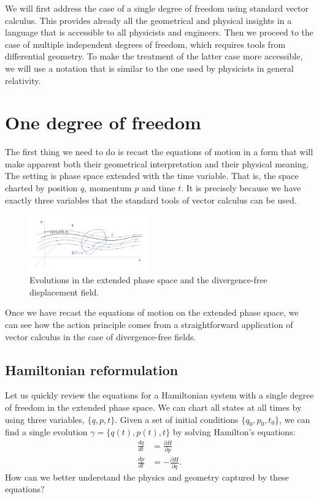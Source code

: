 \documentclass[10pt,twocolumn, nofootinbib]{revtex4-2}
\begin{document}
We will first address the case of a single degree of freedom using standard vector calculus. This provides already all the geometrical and physical insights in a language that is accessible to all physicists and engineers. Then we proceed to the case of multiple independent degrees of freedom, which requires tools from differential geometry. To make the treatment of the latter case more accessible, we will use a notation that is similar to the one used by physicists in general relativity.

\section{One degree of freedom}

The first thing we need to do is recast the equations of motion in a form that will make apparent both their geometrical interpretation and their physical meaning. The setting is phase space extended with the time variable. That is, the space charted by position $q$, momentum $p$ and time $t$. It is precisely because we have exactly three variables that the standard tools of vector calculus can be used.

\begin{figure}
	\includegraphics[width = 0.45\textwidth]{ExtendedPhaseSpace}
	\caption{\footnotesize{Evolutions in the extended phase space and the divergence-free displacement field.}}\label{extended_phase_space}
\end{figure}

Once we have recast the equations of motion on the extended phase space, we can see how the action principle comes from a straightforward application of vector calculus in the case of divergence-free fields.

\subsection{Hamiltonian reformulation}

Let us quickly review the equations for a Hamiltonian system with a single degree of freedom in the extended phase space. We can chart all states at all times by using three variables, $\{q,p,t\}$. Given a set of initial conditions $\{q_0,p_0,t_0\}$, we can find a single evolution $\gamma = \{q(t), p(t), t\}$ by solving Hamilton's equations:
\begin{equation}\label{Hamilton_equations}
\begin{aligned}
	\frac{dq}{dt} &= \frac{\partial H}{\partial p} \\
	\frac{dp}{dt} &= -\frac{\partial H}{\partial q}.
\end{aligned}
\end{equation}
How can we better understand the physics and geometry captured by these equations?
\end{document}
